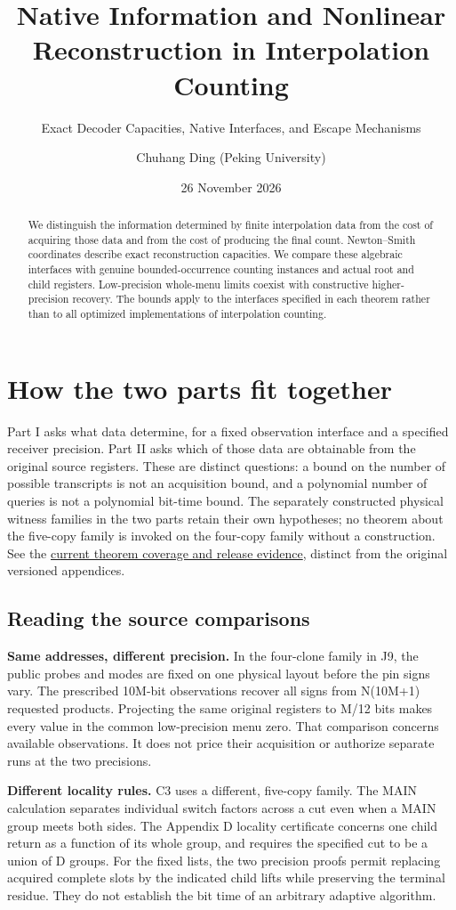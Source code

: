 \documentclass[
  11pt,
]{article}
\title{Native Information and Nonlinear Reconstruction in Interpolation Counting}
\subtitle{Exact Decoder Capacities, Native Interfaces, and Escape Mechanisms}
\author{Chuhang Ding (Peking University)}
\date{26 November 2026}
\begin{document}
\maketitle
\begin{abstract}
We distinguish the information determined by finite interpolation data from
the cost of acquiring those data and from the cost of producing the final
count. Newton--Smith coordinates describe exact reconstruction capacities.
We compare these algebraic interfaces with genuine bounded-occurrence
counting instances and actual root and child registers. Low-precision
whole-menu limits coexist with constructive higher-precision recovery.
The bounds apply to the interfaces specified in each theorem rather than
to all optimized implementations of interpolation counting.
\end{abstract}
\tableofcontents
\section*{How the two parts fit together}
Part I asks what data determine, for a fixed observation interface and a
specified receiver precision. Part II asks which of those data are
obtainable from the original source registers. These are distinct questions:
a bound on the number of possible transcripts is not an acquisition bound,
and a polynomial number of queries is not a polynomial bit-time bound.
The separately constructed physical witness families in the two parts
retain their own hypotheses; no theorem about the five-copy family is
invoked on the four-copy family without a construction.
See the \hyperref[paper6-current-coverage]{current theorem coverage and
release evidence}, distinct from the original versioned appendices.
\subsection*{Reading the source comparisons}
\textbf{Same addresses, different precision.} In the four-clone family in J9, the public probes and modes are fixed on one
physical layout before the pin signs vary. The prescribed 10M-bit observations
recover all signs from N(10M+1) requested products. Projecting the same
original registers to M/12 bits makes every value in the common low-precision
menu zero. That comparison concerns available observations. It does not price
their acquisition or authorize separate runs at the two precisions.

\textbf{Different locality rules.} C3 uses a different, five-copy family. The MAIN calculation separates
individual switch factors across a cut even when a MAIN group meets both
sides. The Appendix D locality certificate concerns one child return as a
function of its whole group, and requires the specified cut to be a union of D
groups. For the fixed lists, the two precision proofs permit replacing
acquired complete slots by the indicated child lifts while preserving the
terminal residue. They do not establish the bit time of an arbitrary adaptive
algorithm.
\end{document}
